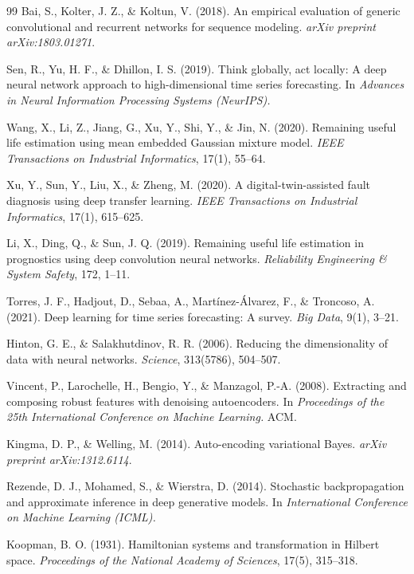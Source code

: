 \documentclass[letterpaper]{article}
\begin{document}
\begin{thebibliography}{99}
 Bai, S., Kolter, J. Z., \& Koltun, V. (2018). An empirical evaluation of generic convolutional and recurrent networks for sequence modeling. \textit{arXiv preprint arXiv:1803.01271}.

 Sen, R., Yu, H. F., \& Dhillon, I. S. (2019). Think globally, act locally: A deep neural network approach to high-dimensional time series forecasting. In \textit{Advances in Neural Information Processing Systems (NeurIPS).}

 Wang, X., Li, Z., Jiang, G., Xu, Y., Shi, Y., \& Jin, N. (2020). Remaining useful life estimation using mean embedded Gaussian mixture model. \textit{IEEE Transactions on Industrial Informatics}, 17(1), 55--64.

 Xu, Y., Sun, Y., Liu, X., \& Zheng, M. (2020). A digital-twin-assisted fault diagnosis using deep transfer learning. \textit{IEEE Transactions on Industrial Informatics}, 17(1), 615--625.

 Li, X., Ding, Q., \& Sun, J. Q. (2019). Remaining useful life estimation in prognostics using deep convolution neural networks. \textit{Reliability Engineering \& System Safety}, 172, 1--11.

 Torres, J. F., Hadjout, D., Sebaa, A., Mart{\'i}nez-{\'A}lvarez, F., \& Troncoso, A. (2021). Deep learning for time series forecasting: A survey. \textit{Big Data}, 9(1), 3--21.

 Hinton, G. E., \& Salakhutdinov, R. R. (2006). Reducing the dimensionality of data with neural networks. \textit{Science}, 313(5786), 504--507.

 Vincent, P., Larochelle, H., Bengio, Y., \& Manzagol, P.-A. (2008). Extracting and composing robust features with denoising autoencoders. In \textit{Proceedings of the 25th International Conference on Machine Learning.} ACM.

 Kingma, D. P., \& Welling, M. (2014). Auto-encoding variational Bayes. \textit{arXiv preprint arXiv:1312.6114}.

 Rezende, D. J., Mohamed, S., \& Wierstra, D. (2014). Stochastic backpropagation and approximate inference in deep generative models. In \textit{International Conference on Machine Learning (ICML).}

 Koopman, B. O. (1931). Hamiltonian systems and transformation in Hilbert space. \textit{Proceedings of the National Academy of Sciences}, 17(5), 315--318.


\end{thebibliography}
\end{document}
